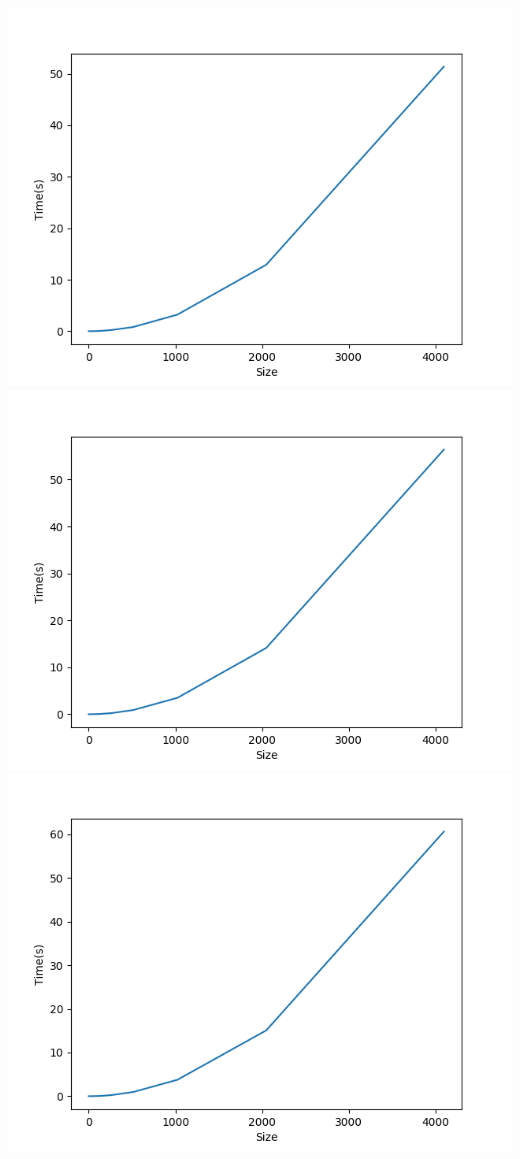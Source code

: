 \documentclass[]{article}
\begin{document}
\includegraphics[scale=0.5]{cc_time_p=04.png}\\
\includegraphics[scale=0.5]{cc_time_p=06.png}
\includegraphics[scale=0.5]{cc_time_p=08.png}
\end{document}
